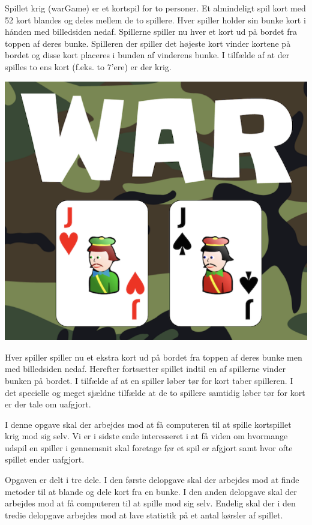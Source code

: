

\begin{minipage}{.67\linewidth}
Spillet krig (warGame) er et kortspil for to personer. Et almindeligt
spil kort med 52 kort blandes og deles mellem de to spillere. Hver
spiller holder sin bunke kort i hånden med billedsiden
nedaf. Spillerne spiller nu hver et kort ud på bordet fra toppen af
deres bunke. Spilleren der spiller det højeste kort vinder kortene på
bordet og disse kort placeres i bunden af vinderens bunke. I tilfælde
af at der spilles to ens kort (f.eks. to 7'ere) er der krig.
\end{minipage}\hfill
\begin{minipage}{.26\linewidth}
  \includegraphics[width=.99\linewidth]{wargame.png}
\end{minipage}

Hver spiller spiller nu et ekstra kort ud på bordet fra toppen af
deres bunke men med billedsiden nedaf. Herefter fortsætter spillet
indtil en af spillerne vinder bunken på bordet. I tilfælde af at en
spiller løber tør for kort taber spilleren. I det specielle og meget
sjældne tilfælde at de to spillere samtidig løber tør for kort er der
tale om uafgjort.

I denne opgave skal der arbejdes mod at få computeren til at spille
kortspillet krig mod sig selv. Vi er i sidste ende interesseret i at
få viden om hvormange udspil en spiller i gennemsnit skal foretage før
et spil er afgjort samt hvor ofte spillet ender uafgjort.

Opgaven er delt i tre dele. I den første delopgave skal der arbejdes
mod at finde metoder til at blande og dele kort fra en bunke. I den
anden delopgave skal der arbejdes mod at få computeren til at spille
mod sig selv. Endelig skal der i den tredie delopgave arbejdes mod at
lave statistik på et antal kørsler af spillet.
